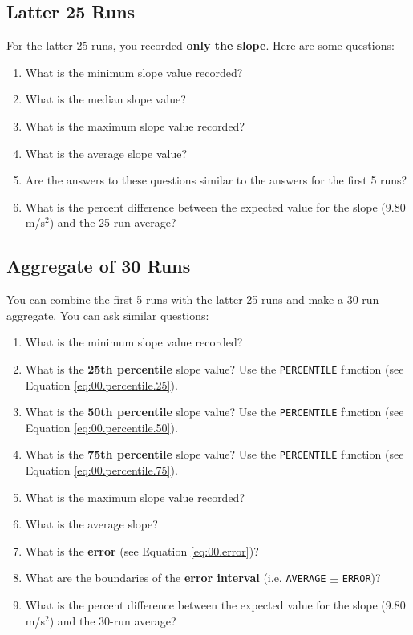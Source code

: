 \subsection{Latter 25 Runs} \label{sec:01.latter.25}
For the latter 25 runs, you recorded \textbf{only the slope}. Here are some questions:
\begin{enumerate}
    \item What is the minimum slope value recorded?
    \item What is the median slope value?
    \item What is the maximum slope value recorded?
    \item What is the average slope value?
    \item Are the answers to these questions similar to the answers for the first 5 runs?
    \item What is the percent difference between the expected value for the slope (9.80 m/s$^{2}$) and the 25-run average?
\end{enumerate}
\subsection{Aggregate of 30 Runs} \label{sec:01.all.30}
You can combine the first 5 runs with the latter 25 runs and make a 30-run aggregate. You can ask similar questions:
\begin{enumerate}
    \item What is the minimum slope value recorded?
    \item What is the \textbf{25th percentile} slope value? Use the \texttt{PERCENTILE} function (see Equation \ref{eq:00.percentile.25}).
    \item What is the \textbf{50th percentile} slope value? Use the \texttt{PERCENTILE} function (see Equation \ref{eq:00.percentile.50}).
    \item What is the \textbf{75th percentile} slope value? Use the \texttt{PERCENTILE} function (see Equation \ref{eq:00.percentile.75}).
    \item What is the maximum slope value recorded?
    \item What is the average slope?
    \item What is the \textbf{error} (see Equation \ref{eq:00.error})?
    \item What are the boundaries of the \textbf{error interval} (i.e. \texttt{AVERAGE} $\pm$ \texttt{ERROR})?
    \item What is the percent difference between the expected value for the slope (9.80 m/s$^{2}$) and the 30-run average?
\end{enumerate}
